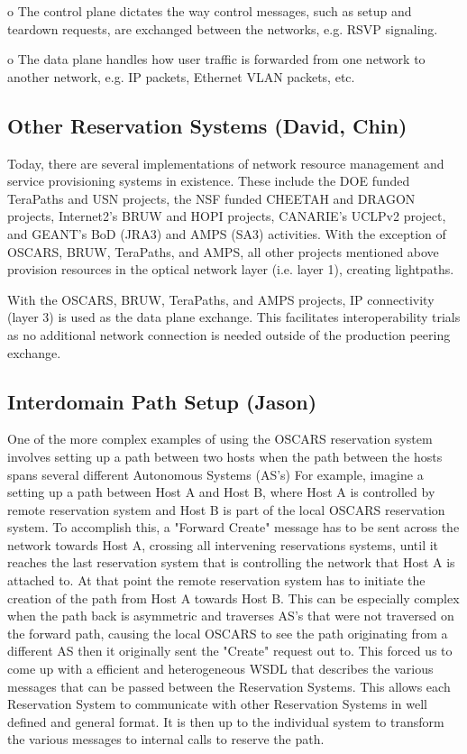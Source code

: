 \documentclass[conference]{IEEEtran}
\begin{document}
o The control plane dictates the way control messages, such as setup and 
teardown requests, are exchanged between the networks, e.g. RSVP signaling.

o The data plane handles how user traffic is forwarded from one network to 
another network, e.g. IP packets, Ethernet VLAN packets, etc.

\subsection{Other Reservation Systems (David, Chin)}

Today, there are several implementations of network resource management and
service provisioning systems in existence.  These include the DOE funded
TeraPaths and USN projects, the NSF funded CHEETAH and DRAGON projects,
Internet2's BRUW and HOPI projects,  CANARIE's UCLPv2 project, and GEANT's
BoD (JRA3) and AMPS (SA3) activities.  With the exception of OSCARS, BRUW,
TeraPaths, and AMPS, all other projects mentioned above provision resources
in the optical network layer (i.e. layer 1), creating lightpaths.

With the OSCARS, BRUW, TeraPaths, and AMPS projects, IP connectivity (layer
3) is used as the data plane exchange.  This facilitates interoperability
trials as no additional network connection is needed outside of the production
peering exchange.

\subsection{Interdomain Path Setup (Jason)}
One of the more complex examples of using the OSCARS reservation system involves
setting up a path between two hosts when the path between the hosts spans
several different Autonomous Systems (AS's) For example, imagine a setting up a
path between Host A and Host B, where Host A is controlled by remote reservation
system and Host B is part of the local OSCARS reservation system.  To accomplish
this, a "Forward Create" message has to be sent across the network towards Host
A, crossing all intervening reservations systems, until it reaches the last
reservation system that is controlling the network that Host A is attached to.
At that point the remote reservation system has to initiate the creation of the
path from Host A towards Host B.  This can be especially complex when the path
back is asymmetric and traverses AS's that were not traversed on the forward
path, causing the local OSCARS to see the path originating from a different 
AS then it originally sent the "Create" request out to. This forced us
to come up with a efficient and heterogeneous WSDL that describes the various
messages that can be passed between the Reservation Systems. This allows
each Reservation System to communicate with other Reservation Systems in 
well defined and general format. It is then up to the individual system to 
transform the various messages to internal calls to reserve the path.
\end{document}
